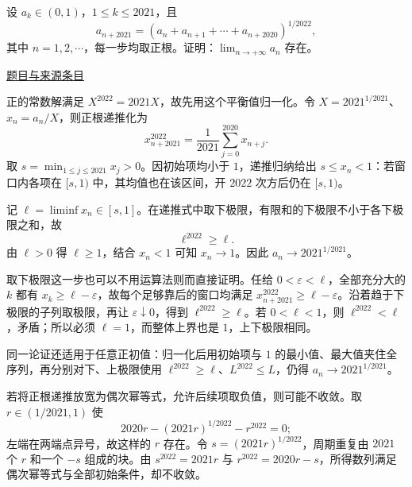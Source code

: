 \documentclass[UTF8,12pt,a4paper,fontset=fandol]{ctexart}
\begin{document}
\begin{example}[来源序号5]\label{ex:ch08-13th-A-makeup:5}\label{pr:ch08-13th-A-makeup:5}

设 $a_{k}\in(0,1)$，$1\leq k\leq 2021$，且
\[
a_{n+2021}=\left(a_{n}+a_{n+1}+\cdots+a_{n+2020}\right)^{1/2022},
\]
其中 $n=1,2,\cdots$，每一步均取正根。证明：$\lim_{n\to+\infty}a_{n}$ 存在。

\par\href{https://github.com/lzxcr/cmc-mathematics/blob/64916fa1fdbc3e444a652eca204d5669058ee321/src/problems/preliminary/13-makeup/05.md}{题目与来源条目}

\end{example}

\begin{solve}\label{ans:ch08-13th-A-makeup:5}

正的常数解满足 $X^{2022}=2021X$，故先用这个平衡值归一化。令 $X=2021^{1/2021}$、$x_n=a_n/X$，则正根递推化为
\[
x_{n+2021}^{2022}=\frac1{2021}\sum_{j=0}^{2020}x_{n+j}.
\]
取 $s=\min_{1\leq j\leq2021}x_j>0$。因初始项均小于 $1$，递推归纳给出 $s\leq x_n<1$：若窗口内各项在 $[s,1)$ 中，其均值也在该区间，开 $2022$ 次方后仍在 $[s,1)$。

记 $\ell=\liminf x_n\in[s,1]$。在递推式中取下极限，有限和的下极限不小于各下极限之和，故
\[
\ell^{2022}\geq\ell.
\]
由 $\ell>0$ 得 $\ell\geq1$，结合 $x_n<1$ 可知 $x_n\to1$。因此 $a_n\to2021^{1/2021}$。

取下极限这一步也可以不用运算法则而直接证明。任给 $0<\varepsilon<\ell$，全部充分大的 $k$ 都有 $x_k\ge\ell-\varepsilon$，故每个足够靠后的窗口均满足 $x_{n+2021}^{2022}\ge\ell-\varepsilon$。沿着趋于下极限的子列取极限，再让 $\varepsilon\downarrow0$，得到 $\ell^{2022}\ge\ell$。若 $0<\ell<1$，则 $\ell^{2022}<\ell$，矛盾；所以必须 $\ell=1$，而整体上界也是 $1$，上下极限相同。

\end{solve}

\begin{remark}[方法与条件]同一论证还适用于任意正初值：归一化后用初始项与 $1$ 的最小值、最大值夹住全序列，再分别对下、上极限使用 $\ell^{2022}\geq\ell$、$L^{2022}\leq L$，仍得 $a_n\to2021^{1/2021}$。

若将正根递推放宽为偶次幂等式，允许后续项取负值，则可能不收敛。取 $r\in(1/2021,1)$ 使
\[
2020r-(2021r)^{1/2022}-r^{2022}=0;
\]
左端在两端点异号，故这样的 $r$ 存在。令 $s=(2021r)^{1/2022}$，周期重复由 $2021$ 个 $r$ 和一个 $-s$ 组成的块。由 $s^{2022}=2021r$ 与 $r^{2022}=2020r-s$，所得数列满足偶次幂等式与全部初始条件，却不收敛。\end{remark}
\end{document}
